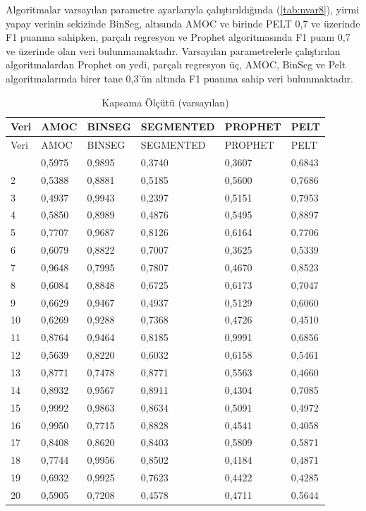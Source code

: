 \documentclass[12pt,twoside]{deuthesis}
\begin{document}
Algoritmalar varsayılan parametre ayarlarıyla çalıştırıldığında (\ref{tab:nvar8}), yirmi yapay verinin sekizinde BinSeg, altısında AMOC ve birinde PELT 0,7 ve üzerinde F1 puanına sahipken, parçalı regresyon ve Prophet algoritmasında F1 puanı 0,7 ve üzerinde olan veri bulunmamaktadır.
Varsayılan parametrelerle çalıştırılan algoritmalardan Prophet on yedi, parçalı regresyon üç, AMOC, BinSeg ve Pelt algoritmalarında birer tane 0,3'ün altında F1 puanına sahip veri bulunmaktadır.

\begin{longtable}[]{@{}llllll@{}}
\caption{\label{tab:nvar9} Kapsama Ölçütü (varsayılan)}\tabularnewline
\toprule\noalign{}
Veri & AMOC & BINSEG & SEGMENTED & PROPHET & PELT \\
\midrule\noalign{}
\endfirsthead
\toprule\noalign{}
Veri & AMOC & BINSEG & SEGMENTED & PROPHET & PELT \\
\midrule\noalign{}
\endhead
\bottomrule\noalign{}
\endlastfoot
1 & 0,5975 & 0,9895 & 0,3740 & 0,3607 & 0,6843 \\
2 & 0,5388 & 0,8881 & 0,5185 & 0,5600 & 0,7686 \\
3 & 0,4937 & 0,9943 & 0,2397 & 0,5151 & 0,7953 \\
4 & 0,5850 & 0,8989 & 0,4876 & 0,5495 & 0,8897 \\
5 & 0,7707 & 0,9687 & 0,8126 & 0,6164 & 0,7706 \\
6 & 0,6079 & 0,8822 & 0,7007 & 0,3625 & 0,5339 \\
7 & 0,9648 & 0,7995 & 0,7807 & 0,4670 & 0,8523 \\
8 & 0,6084 & 0,8848 & 0,6725 & 0,6173 & 0,7047 \\
9 & 0,6629 & 0,9467 & 0,4937 & 0,5129 & 0,6060 \\
10 & 0,6269 & 0,9288 & 0,7368 & 0,4726 & 0,4510 \\
11 & 0,8764 & 0,9464 & 0,8185 & 0,9991 & 0,6856 \\
12 & 0,5639 & 0,8220 & 0,6032 & 0,6158 & 0,5461 \\
13 & 0,8771 & 0,7478 & 0,8771 & 0,5563 & 0,4660 \\
14 & 0,8932 & 0,9567 & 0,8911 & 0,4304 & 0,7085 \\
15 & 0,9992 & 0,9863 & 0,8634 & 0,5091 & 0,4972 \\
16 & 0,9950 & 0,7715 & 0,8828 & 0,4541 & 0,4058 \\
17 & 0,8408 & 0,8620 & 0,8403 & 0,5809 & 0,5871 \\
18 & 0,7744 & 0,9956 & 0,8502 & 0,4184 & 0,4871 \\
19 & 0,6932 & 0,9925 & 0,7623 & 0,4422 & 0,4285 \\
20 & 0,5905 & 0,7208 & 0,4578 & 0,4711 & 0,5644 \\
\end{longtable}
\end{document}
